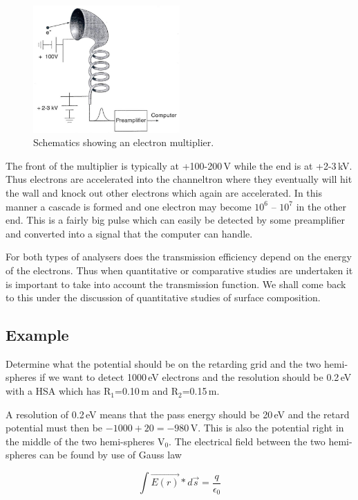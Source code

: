 \begin{figure}[htbp]
\centering
\includegraphics[width=0.5\textwidth]{figures/03_03}
\caption{Schematics showing an electron multiplier.}
\label{fig:electron_multiplier}
\end{figure}

The front of the multiplier is typically at +100-200\,V while the end is at +2-3\,kV. Thus electrons are accelerated into the channeltron where they eventually will hit the wall and knock out other electrons which again are accelerated. In this manner a cascade is formed and one electron may become $10^{6}$ -- $10^{7}$ in the other end. This is a fairly big pulse which can easily be detected by some preamplifier and converted into a signal that the computer can handle.

For both types of analysers does the transmission efficiency depend on the energy of the electrons. Thus when quantitative or comparative studies are undertaken it is important to take into account the transmission function. We shall come back to this under the discussion of quantitative studies of surface composition.


\subsection{Example}
Determine what the potential should be on the retarding grid and the two hemi-spheres if we want to detect 1000\,eV electrons and the resolution should be 0.2\,eV with a HSA which has R$_{1}$=0.10\,m and R$_{2}$=0.15\,m.

A resolution of 0.2\,eV means that the pass energy should be 20\,eV and the retard potential must then be $-1000+20 = -980$\,V. This is also the potential right in the middle of the two hemi-spheres V$_{0}$. The electrical field between the two hemi-spheres can be found by use of Gauss law

\begin{equation}
\int \vec{E(r)}*d\vec{s}=\frac{q}{\epsilon_{0}}
\end{equation}

